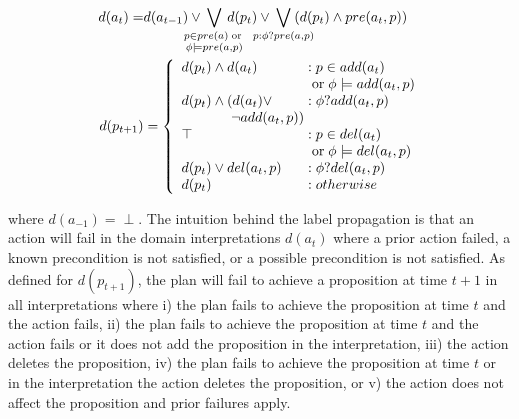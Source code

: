 \documentclass{article}
\begin{document}
 \begin{align}
\notag d({a}_t) =&  
d(a_{t-1}) \vee\hspace*{-.5cm} \bigvee\limits_{\substack{p \in pre(a)
\;\text{or}\;\\\phi \models pre(a, p)}}\hspace*{-.5cm} d(p_t) \vee
\hspace*{-.5cm}\bigvee\limits_{\substack{p : \phi?pre(a, p)}}
\hspace*{-.5cm}(d(p_t)\wedge pre({a}_t, p)  ) \notag %
\\
\notag\hspace*{-.1cm}d(p_{t+1}) &= \left\{
\begin{array}{l@{\;}l@{\;}r}
d(p_t) \wedge d({a}_t) & : p \in add({a}_t) \\ 
 & \;\text{or}\; \phi \models add({a}_t, p)\\
d(p_t) \wedge (d({a}_t) \vee & : \phi?add({a}_t,p)\\
 \hspace*{1.25cm} \neg add({a}_t, p)) \\  
\top & : p \in del({a}_t)\\
 & \;\text{or}\; \phi \models del({a}_t,p)\\
d(p_t) \vee  del({a}_t, p)  &: \phi?del({a}_t, p)\\
d(p_t) & : {otherwise} 
\end{array}
\right. 
\end{align}

\noindent where $d({a}_{-1}) = \perp$. The intuition behind the label
propagation is that an action will fail  in the
domain interpretations $d({a}_t)$ where a prior action failed, a known
precondition is not satisfied, or a possible precondition is not satisfied. As defined for
$d(p_{t+1})$, the plan will fail to achieve a proposition at time $t+1$ in all
interpretations where i) the plan fails to achieve the proposition at time $t$ and the action fails, ii) the plan fails to achieve the proposition at
time $t$ and the action fails or it does not add the proposition in the
interpretation, iii) the action deletes the proposition, iv) the plan fails to
achieve the proposition at time $t$ or in the interpretation the action deletes
the proposition, or v) the action does not affect the proposition and  prior
failures  apply.             
\end{document}
